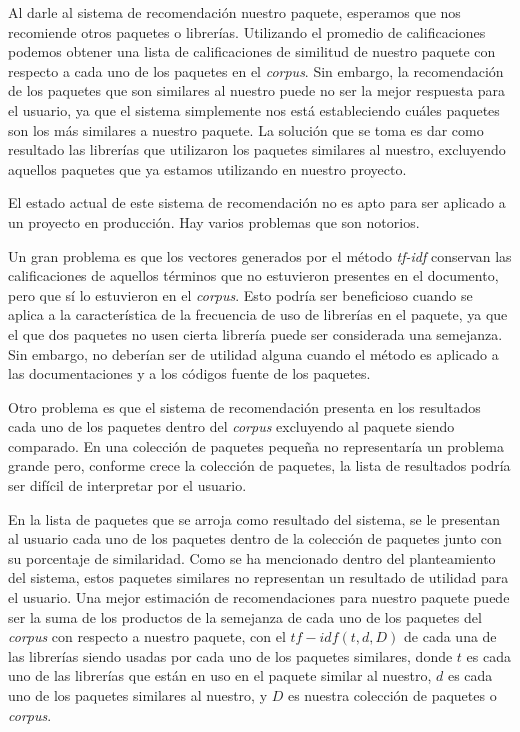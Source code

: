 \documentclass[times, 10pt,twocolumn, a4paper]{article}
\begin{document}

Al darle al sistema de recomendaci\'on nuestro paquete, esperamos que
nos recomiende otros paquetes o librer\'ias. Utilizando el promedio de
calificaciones podemos obtener una lista de calificaciones de
similitud de nuestro paquete con respecto a cada uno de los paquetes
en el \textit{corpus}. Sin embargo, la recomendaci\'on de los paquetes
que son similares al nuestro puede no ser la mejor respuesta para el
usuario, ya que el sistema simplemente nos est\'a estableciendo
cu\'ales paquetes son los m\'as similares a nuestro paquete. La
soluci\'on que se toma es dar como resultado las librer\'ias que
utilizaron los paquetes similares al nuestro, excluyendo aquellos
paquetes que ya estamos utilizando en nuestro proyecto.

\label{Futuros}

El estado actual de este sistema de recomendaci\'on no es apto para
ser aplicado a un proyecto en producci\'on. Hay varios problemas que
son notorios.

Un gran problema es que los vectores generados por el m\'etodo
\textit{tf-idf} conservan las calificaciones de aquellos t\'erminos
que no estuvieron presentes en el documento, pero que s\'i lo
estuvieron en el \textit{corpus}. Esto podr\'ia ser beneficioso cuando
se aplica a la caracter\'istica de la frecuencia de uso de librer\'ias
en el paquete, ya que el que dos paquetes no usen cierta librer\'ia
puede ser considerada una semejanza. Sin embargo, no deber\'ian ser de
utilidad alguna cuando el m\'etodo es aplicado a las documentaciones y
a los c\'odigos fuente de los paquetes.

Otro problema es que el sistema de recomendaci\'on presenta en los
resultados cada uno de los paquetes dentro del \textit{corpus}
excluyendo al paquete siendo comparado. En una colecci\'on de paquetes
peque\~na no representar\'ia un problema grande pero, conforme crece
la colecci\'on de paquetes, la lista de resultados podr\'ia ser
dif\'icil de interpretar por el usuario.

En la lista de paquetes que se arroja como resultado del sistema, se
le presentan al usuario cada uno de los paquetes dentro de la
colecci\'on de paquetes junto con su porcentaje de similaridad. Como
se ha mencionado dentro del planteamiento del sistema, estos paquetes
similares no representan un resultado de utilidad para el usuario. Una
mejor estimaci\'on de recomendaciones para nuestro paquete puede ser
la suma de los productos de la semejanza de cada uno de los paquetes
del \textit{corpus} con respecto a nuestro
paquete, con el \(tf-idf(t,d,D)\) de cada una de las librer\'ias
siendo usadas por cada uno de los paquetes similares, donde \(t\) es cada uno de las
librer\'ias que est\'an en uso en el paquete similar al nuestro, \(d\)
es cada uno de los paquetes similares al nuestro, y \(D\) es nuestra
colecci\'on de paquetes o \textit{corpus}.
\end{document}
